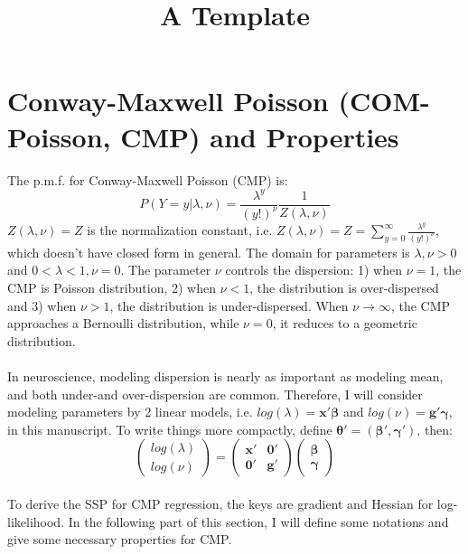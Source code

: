 \documentclass[]{article}
\title{A Template}
\begin{document}
	
\section{Conway-Maxwell Poisson (COM-Poisson, CMP) and Properties}
The p.m.f. for Conway-Maxwell Poisson (CMP) is:
\begin{equation*}
	P(Y = y|\lambda, \nu) = \frac{\lambda^{y}}{(y!)^{\nu}}\frac{1}{Z(\lambda, \nu)}
\end{equation*}
$Z(\lambda, \nu) = Z$ is the normalization constant, i.e. $Z(\lambda, \nu) = Z = \sum_{y=0}^{\infty}\frac{\lambda^{y}}{(y!)^{\nu}}$, which doesn't have closed form in general. The domain for parameters is $\lambda, \nu > 0$ and $0 < \lambda < 1, \nu = 0$. The parameter $\nu$ controls the dispersion: 1) when $\nu = 1$, the CMP is Poisson distribution, 2) when $\nu < 1$, the distribution is over-dispersed and 3) when $\nu > 1$, the distribution is under-dispersed. When $\nu\to\infty$, the CMP approaches a Bernoulli distribution, while $\nu=0$, it reduces to a geometric distribution.\\
\\
In neuroscience, modeling dispersion is nearly as important as modeling mean, and both under-and over-dispersion are common. Therefore, I will consider modeling parameters by 2 linear models, i.e. $log(\lambda) = \boldsymbol{x}'\boldsymbol{\beta}$ and $log(\nu) = \boldsymbol{g}'\boldsymbol{\gamma}$, in this manuscript. To write things more compactly, define $\boldsymbol{\theta}' = (\boldsymbol{\beta}', \boldsymbol{\gamma}')$, then:
\begin{equation*}
	\begin{pmatrix} log(\lambda)\\ log(\nu) \end{pmatrix} =
	\begin{pmatrix}
		\boldsymbol{x}' & \boldsymbol{0}'\\
		\boldsymbol{0}' & \boldsymbol{g}'
	\end{pmatrix}\begin{pmatrix}
	\boldsymbol{\beta} \\ \boldsymbol{\gamma}
\end{pmatrix}
\end{equation*}
\\
To derive the SSP for CMP regression, the keys are gradient and Hessian for log-likelihood. In the following part of this section, I will define some notations and give some necessary properties for CMP.\\
\\
\end{document}
